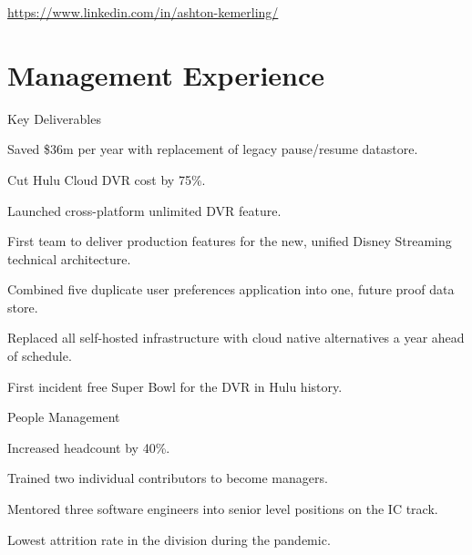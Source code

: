 \documentclass[]{deedy-resume-openfont}
\begin{document}
%
%
\lastupdated

%
%



\href{https://www.linkedin.com/in/ashton-kemerling/}{https://www.linkedin.com/in/ashton-kemerling/}

\begin{center}
\end{center}

\section{Management Experience}

\vspace{\topsep}
Key Deliverables
\begin{tightemize}
\item Saved \$36m per year with replacement of legacy pause/resume datastore.
\item Cut Hulu Cloud DVR cost by 75\%.
\item Launched cross-platform unlimited DVR feature.
\item First team to deliver production features for the new, unified Disney Streaming technical architecture.
\item Combined five duplicate user preferences application into one, future proof data store.
\item Replaced all self-hosted infrastructure with cloud native alternatives a year ahead of schedule.
\item First incident free Super Bowl for the DVR in Hulu history.
\end{tightemize}

\sectionsep
People Management
\begin{tightemize}
\item Increased headcount by 40\%.
\item Trained two individual contributors to become managers.
\item Mentored three software engineers into senior level positions on the IC track.
\item Lowest attrition rate in the division during the pandemic.
\end{tightemize}
\sectionsep
\end{document}
